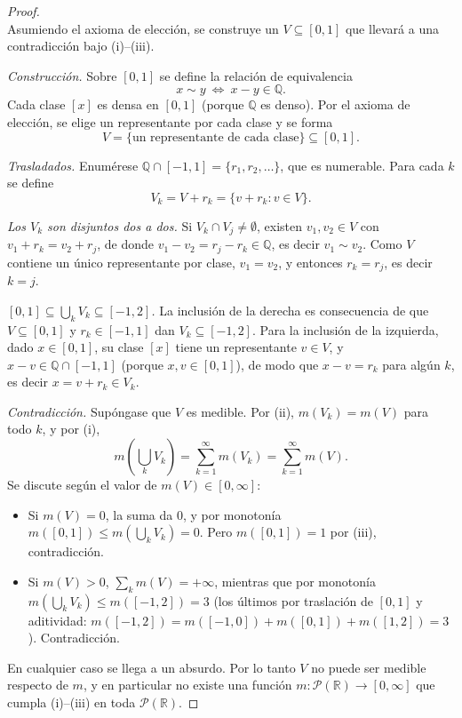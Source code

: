 \documentclass[11pt, a4paper]{article}
\begin{document}
\begin{proof}\leavevmode\\
Asumiendo el axioma de elección, se construye un $V \subseteq [0, 1]$ que llevará a una
contradicción bajo (i)--(iii).

\textit{Construcción.} Sobre $[0, 1]$ se define la relación de equivalencia
$$ x \sim y \ \Leftrightarrow \ x - y \in \mathbb{Q}. $$
Cada clase $[x]$ es densa en $[0, 1]$ (porque $\mathbb{Q}$ es denso). Por el axioma de elección,
se elige un representante por cada clase y se forma
$$ V = \{\text{un representante de cada clase}\} \subseteq [0, 1]. $$

\textit{Trasladados.} Enumérese $\mathbb{Q} \cap [-1, 1] = \{r_1, r_2, \dots\}$, que es numerable.
Para cada $k$ se define
$$ V_k = V + r_k = \{v + r_k : v \in V\}. $$

\textit{Los $V_k$ son disjuntos dos a dos.} Si $V_k \cap V_j \ne \emptyset$, existen $v_1, v_2 \in
V$ con $v_1 + r_k = v_2 + r_j$, de donde $v_1 - v_2 = r_j - r_k \in \mathbb{Q}$, es decir
$v_1 \sim v_2$. Como $V$ contiene un único representante por clase, $v_1 = v_2$, y entonces
$r_k = r_j$, es decir $k = j$.

\textit{$[0, 1] \subseteq \bigcup_k V_k \subseteq [-1, 2]$.} La inclusión de la derecha es
consecuencia de que $V \subseteq [0, 1]$ y $r_k \in [-1, 1]$ dan $V_k \subseteq [-1, 2]$. Para la
inclusión de la izquierda, dado $x \in [0, 1]$, su clase $[x]$ tiene un representante $v \in V$,
y $x - v \in \mathbb{Q} \cap [-1, 1]$ (porque $x, v \in [0, 1]$), de modo que $x - v = r_k$ para
algún $k$, es decir $x = v + r_k \in V_k$.

\textit{Contradicción.} Supóngase que $V$ es medible. Por (ii), $m(V_k) = m(V)$ para todo $k$,
y por (i),
$$ m\!\left(\bigcup_k V_k\right) = \sum_{k=1}^\infty m(V_k) = \sum_{k=1}^\infty m(V). $$
Se discute según el valor de $m(V) \in [0, \infty]$:
\begin{itemize}
    \item Si $m(V) = 0$, la suma da $0$, y por monotonía $m([0, 1]) \le m(\bigcup_k V_k) = 0$.
    Pero $m([0, 1]) = 1$ por (iii), contradicción.
    \item Si $m(V) > 0$, $\sum_k m(V) = +\infty$, mientras que por monotonía $m(\bigcup_k V_k)
    \le m([-1, 2]) = 3$ (los últimos por traslación de $[0, 1]$ y aditividad: $m([-1, 2]) =
    m([-1, 0]) + m([0, 1]) + m([1, 2]) = 3$). Contradicción.
\end{itemize}
En cualquier caso se llega a un absurdo. Por lo tanto $V$ no puede ser medible respecto de $m$, y
en particular no existe una función $m: \mathcal{P}(\mathbb{R}) \to [0, \infty]$ que cumpla
(i)--(iii) en toda $\mathcal{P}(\mathbb{R})$.
\end{proof}
\end{document}
